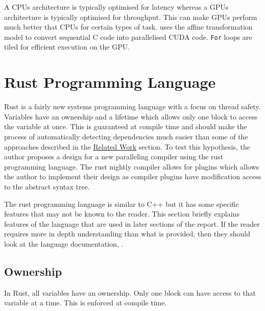 \pagebreak %
A CPUs architecture is typically optimised for latency whereas a GPUs architecture is typically optimised for throughput. This can make GPUs perform much better that CPUs for certain types of task. \textcite{Baskaran2010} uses the affine transformation model to convert sequential C code into parallelised CUDA code. \texttt{For} loops are tiled for efficient execution on the GPU.

\section{Rust Programming Language}
\label{sec:rust-language-features}
Rust is a fairly new systems programming language with a focus on thread safety. Variables have an ownership and a lifetime which allows only one block to access the variable at once. This is guaranteed at compile time and should make the process of automatically detecting dependencies much easier than some of the approaches described in the \hyperref[sec:related-work]{Related Work} section. To test this hypothesis, the author proposes a design for a new paralleling compiler using the rust programming language. The rust nightly compiler allows for plugins which allows the author to implement their design as compiler plugins have modification access to the abstract syntax tree.

The rust programming language is similar to C++ but it has some specific features that may not be known to the reader. This section briefly explains features of the language that are used in later sections of the report. If the reader requires more in depth understanding than what is provided, then they should look at the language documentation, \textcite{rustbook}.


\subsection{Ownership}
In Rust, all variables have an ownership. Only one block can have access to that variable at a time. This is enforced at compile time.

